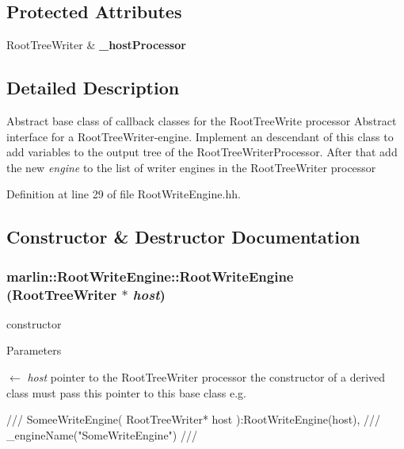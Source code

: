 \subsection*{Protected Attributes}
\begin{DoxyCompactItemize}
\item 
RootTreeWriter \& {\bfseries \_\-hostProcessor}\label{classmarlin_1_1RootWriteEngine_ab53e690ff0f758b27f4ef45b87f3d3ce}

\end{DoxyCompactItemize}


\subsection{Detailed Description}
Abstract base class of callback classes for the RootTreeWrite processor Abstract interface for a RootTreeWriter-\/engine. Implement an descendant of this class to add variables to the output tree of the RootTreeWriterProcessor. After that add the new {\itshape engine\/} to the list of writer engines in the RootTreeWriter processor 

Definition at line 29 of file RootWriteEngine.hh.

\subsection{Constructor \& Destructor Documentation}
\subsubsection[{RootWriteEngine}]{\setlength{\rightskip}{0pt plus 5cm}marlin::RootWriteEngine::RootWriteEngine (RootTreeWriter $\ast$ {\em host})\hspace{0.3cm}{\ttfamily  [inline]}}\label{classmarlin_1_1RootWriteEngine_a9a2f783fbd71d43487cb94feee09210a}


constructor 
\begin{DoxyParams}{Parameters}
\item[\mbox{$\leftarrow$} {\em host}]pointer to the RootTreeWriter processor the constructor of a derived class must pass this pointer to this base class e.g. \begin{DoxyVerb}
    /// SomeeWriteEngine( RootTreeWriter* host ):RootWriteEngine(host),
    ///                                          _engineName("SomeWriteEngine")
    /// {} \end{DoxyVerb}
 \end{DoxyParams}


